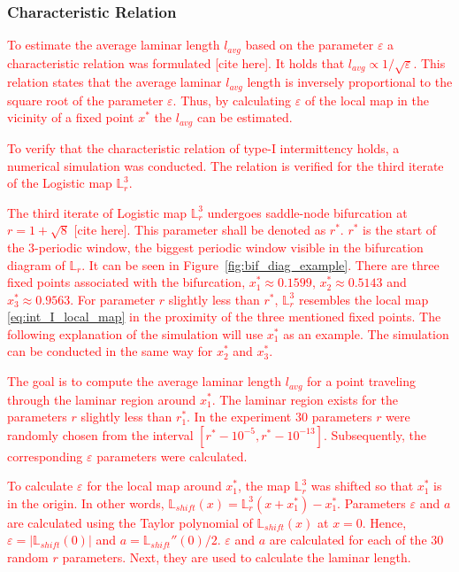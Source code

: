 \subsubsection{Characteristic Relation}
\textcolor{red}{
To estimate the average laminar length $l_{avg}$ based on the parameter $\varepsilon$ a characteristic relation was formulated [cite here].
It holds that $l_{avg} \propto 1/\sqrt{\varepsilon}$.
This relation states that the average laminar $l_{avg}$ length is inversely proportional to the square root of the parameter $\varepsilon$.
Thus, by calculating $\varepsilon$ of the local map in the vicinity of a fixed point $x^{*}$ the $l_{avg}$ can be estimated.
}
\par
\textcolor{red}{
To verify that the characteristic relation of type-I intermittency holds, a numerical simulation was conducted.
The relation is verified for the third iterate of the Logistic map $\mathbb{L}_{r}^{3}$.
}
\par
\textcolor{red}{
The third iterate of Logistic map $\mathbb{L}_{r}^{3}$ undergoes saddle-node bifurcation at $r = 1+\sqrt{8}$ [cite here].
This parameter shall be denoted as $r^{*}$.
$r^{*}$ is the start of the $3$-periodic window, the biggest periodic window visible in the bifurcation diagram of $\mathbb{L}_{r}$.
It can be seen in Figure~\ref{fig:bif_diag_example}.
There are three fixed points associated with the bifurcation, $x^{*}_{1} \approx 0.1599$, $x^{*}_{2} \approx 0.5143$ and $x^{*}_{3} \approx 0.9563$.
For parameter $r$ slightly less than $r^{*}$, $\mathbb{L}_{r}^{3}$ resembles the local map \ref{eq:int_I_local_map} in the proximity of the three mentioned fixed points.
The following explanation of the simulation will use $x^{*}_{1}$ as an example.
The simulation can be conducted in the same way for $x^{*}_{2}$ and $x^{*}_{3}$.
}
\par
\textcolor{red}{
The goal is to compute the average laminar length $l_{avg}$ for a point traveling through the laminar region around $x^{*}_{1}$.
The laminar region exists for the parameters $r$ slightly less than $r^{*}_{1}$.
In the experiment $30$ parameters $r$ were randomly chosen from the interval $[ r^{*}-10^{-5}, r^{*}-10^{-13} ]$.
Subsequently, the corresponding $\varepsilon$ parameters were calculated.
}
\par
\textcolor{red}{
To calculate $\varepsilon$ for the local map around $x^{*}_{1}$, the map $\mathbb{L}_{r}^{3}$ was shifted so that $x^{*}_{1}$ is in the origin.
In other words, $\mathbb{L}_{shift}(x) = \mathbb{L}_{r}^{3}(x + x^{*}_{1}) - x^{*}_{1}$.
Parameters $\varepsilon$ and $a$ are calculated using the Taylor polynomial of $\mathbb{L}_{shift}(x)$ at $x = 0$.
Hence, $\varepsilon = | \mathbb{L}_{shift}(0) |$ and $a = \mathbb{L}_{shift}''(0) / 2$.
$\varepsilon$ and $a$ are calculated for each of the $30$ random $r$ parameters.
Next, they are used to calculate the laminar length.
}
